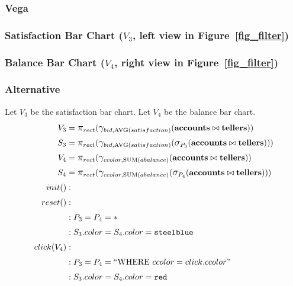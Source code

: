 \documentclass[fleqn,reprint]{sigplanconf}
\begin{document}
\subsubsection{Vega}
\subsubsection*{Satisfaction Bar Chart ($V_3$, left view in Figure~\ref{fig_filter})}

\subsubsection*{Balance Bar Chart ($V_4$, right view in Figure~\ref{fig_filter})}

\subsubsection{Alternative}
Let $V_3$ be the satisfaction bar chart.
Let $V_4$ be the balance bar chart.
\begin{align*}
	V_3&= \mathlarger{\pi}_{rect}(\mathlarger{\gamma}_{bid, \text{AVG}(satisfaction)}(\bf{accounts}\bowtie{}\bf{tellers}))\\
	S_3&= \mathlarger{\pi}_{rect}(\mathlarger{\gamma}_{bid, \text{AVG}(satisfaction)}(\mathlarger{\sigma}_{P_3}(\bf{accounts}\bowtie{}\bf{tellers})))\\
	V_4&= \mathlarger{\pi}_{rect}(\mathlarger{\gamma}_{ccolor, \text{SUM}(abalance)}(\bf{accounts}\bowtie{}\bf{tellers}))\\
	S_4&= \mathlarger{\pi}_{rect}(\mathlarger{\gamma}_{ccolor, \text{SUM}(abalance)}(\mathlarger{\sigma}_{P_4}(\bf{accounts}\bowtie{}\bf{tellers})))\\
	init()&:\\
	reset()&:\\
	&: P_3 = P_4 = *\\
	&: S_3.color = S_4.color = \texttt{steelblue}\\
	click(V_4)&:\\
	&: P_3 = P_4 = ``\text{WHERE}~ccolor=click.ccolor"\\
	&: S_3.color = S_4.color = \texttt{red}\\
\end{align*}
\pagebreak
\end{document}
